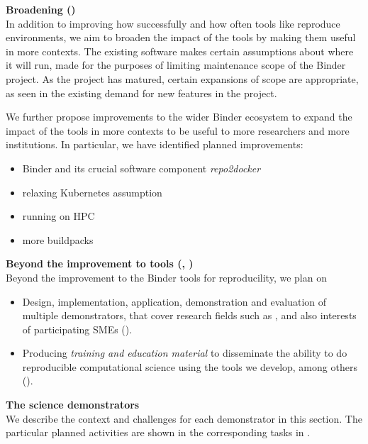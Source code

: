 \medskip
\noindent\textbf{Broadening  ()}\\
In addition to improving how successfully and how often tools like \repotodocker{} reproduce environments,
we aim to broaden the impact of the tools by making them useful in more contexts.
The existing software makes certain assumptions about where it will run,
made for the purposes of limiting maintenance scope of the Binder project.
As the project has matured, certain expansions of scope are appropriate,
as seen in the existing demand for new features in the project.

We further propose improvements to the wider Binder ecosystem
to expand the impact of the tools in more contexts to be useful to more researchers
and more institutions.
In particular, we have identified planned improvements:

\begin{itemize}
  \item Binder and its crucial software component \emph{repo2docker}
  \item relaxing Kubernetes assumption
  \item running on HPC
  \item more buildpacks

\end{itemize}

\medskip\noindent\textbf{Beyond the improvement to \TheProject tools
  (, )}\\
Beyond the improvement to the Binder tools for reproducility, we plan on
\begin{itemize}
\item Design, implementation, application, demonstration and
  evaluation of multiple demonstrators, that cover research fields such as
  ,
  and also interests of participating SMEs ().
\item Producing \emph{training and education material} to disseminate
  the ability to do reproducible computational science using the tools
  we develop, among others ().
\end{itemize}

\medskip
\noindent
\textbf{The science
  demonstrators}\label{sec:science-demonstrators-in-concept}\\

We describe the context and challenges for each demonstrator in this
section. The particular planned activities are shown in the
corresponding tasks in .\\


